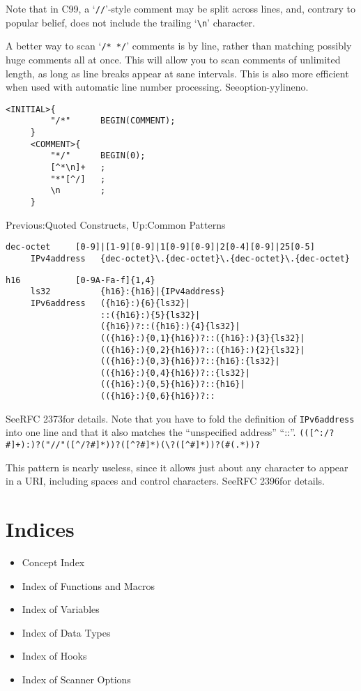 \documentclass[openany,oneside]{book}
\begin{document}
Note that in C99, a ‘\verb`//`’-style comment may be split across lines,  and, contrary to popular belief,
does not include the trailing ‘\verb`\n`’ character.

A better way to scan ‘\verb`/* */`’ comments is by line, rather than matching
possibly huge comments all at once. This will allow you to scan comments of
unlimited length, as long as line breaks appear at sane intervals. This is also
more efficient when used with automatic line number processing. Seeoption-yylineno.
\begin{verbatim}
<INITIAL>{
         "/*"      BEGIN(COMMENT);
     }
     <COMMENT>{
         "*/"      BEGIN(0);
         [^*\n]+   ;
         "*"[^/]   ;
         \n        ;
     }
\end{verbatim}



Previous:Quoted Constructs,
Up:Common Patterns
\begin{verbatim}
dec-octet     [0-9]|[1-9][0-9]|1[0-9][0-9]|2[0-4][0-9]|25[0-5]
     IPv4address   {dec-octet}\.{dec-octet}\.{dec-octet}\.{dec-octet}
\end{verbatim}

\begin{verbatim}
h16           [0-9A-Fa-f]{1,4}
     ls32          {h16}:{h16}|{IPv4address}
     IPv6address   ({h16}:){6}{ls32}|
                   ::({h16}:){5}{ls32}|
                   ({h16})?::({h16}:){4}{ls32}|
                   (({h16}:){0,1}{h16})?::({h16}:){3}{ls32}|
                   (({h16}:){0,2}{h16})?::({h16}:){2}{ls32}|
                   (({h16}:){0,3}{h16})?::{h16}:{ls32}|
                   (({h16}:){0,4}{h16})?::{ls32}|
                   (({h16}:){0,5}{h16})?::{h16}|
                   (({h16}:){0,6}{h16})?::
\end{verbatim}


SeeRFC 2373for details. 
Note that you have to fold the definition of \verb`IPv6address` into one
line and that it also matches the “unspecified address” “::”. \verb`(([^:/?#]+):)?("//"([^/?#]*))?([^?#]*)(\?([^#]*))?(#(.*))?` 

This pattern is nearly useless, since it allows just about any character
to appear in a URI, including spaces and control characters.  SeeRFC 2396for details.
\chapter{Indices}

\begin{itemize}
\item Concept Index
\item Index of Functions and Macros
\item Index of Variables
\item Index of Data Types
\item Index of Hooks
\item Index of Scanner Options
\end{itemize}
\end{document}
